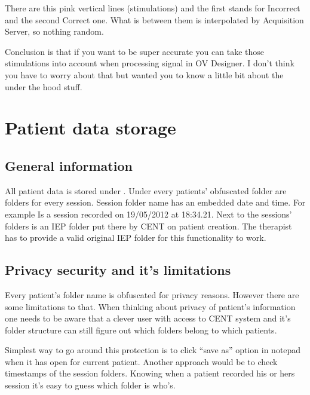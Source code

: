 \documentclass[letterpaper,10pt,english]{sphinxmanual}
\begin{document}
There are this pink vertical lines (stimulations) and the first stands for Incorrect and the second Correct one. What is between them is interpolated by Acquisition Server, so nothing random.

Conclusion is that if you want to be super accurate you can take those stimulations into account when processing signal in OV Designer. I don't think you have to worry about that but wanted you to know a little bit about the under the hood stuff.


\section{\textbf{Patient data storage}}
\label{index:id5}\label{index:patient-data-storage}

\subsection{\textbf{General information}}
\label{index:id6}
All patient data is stored under . Under every patients' obfuscated folder are folders for every session. Session folder name has an embedded date and time. For example  Is a session recorded on 19/05/2012 at 18:34.21.
Next to the sessions' folders is an IEP folder put there by CENT on patient creation. The therapist has to provide a valid original IEP folder for this functionality to work.


\subsection{\textbf{Privacy security and it's limitations}}
\label{index:privacy-security-and-it-s-limitations}
Every patient's folder name is obfuscated for privacy reasons. However there are some limitations to that. When thinking about privacy of patient's information one needs to be aware that a clever user with access to CENT system and it's folder structure can still figure out which folders belong to which patients.

Simplest way to go around this protection is to click ``save as'' option in notepad when it has  open for current patient. Another approach would be to check timestamps of the session folders. Knowing when a patient recorded his or hers session it's easy to guess which folder is who's.
\end{document}
